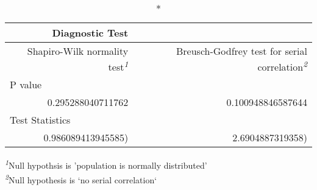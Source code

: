 \setlength{\LTpost}{0mm}
\begin{longtable}{rr}
\caption*{
{\large Diagnostic Test}
} \\ 
\toprule
Shapiro-Wilk normality test\textsuperscript{\textit{1}} & Breusch-Godfrey test for serial correlation\textsuperscript{\textit{2}} \\ 
\midrule
\multicolumn{2}{l}{P value} \\ 
\midrule
0.295288040711762 & 0.100948846587644 \\ 
\midrule
\multicolumn{2}{l}{Test Statistics} \\ 
0.986089413945585) & 2.6904887319358) \\ 
\bottomrule
\end{longtable}
\begin{minipage}{\linewidth}
\textsuperscript{\textit{1}}Null hypothsis is 'population is normally distributed'\\
\textsuperscript{\textit{2}}Null hypothesis is `no serial correlation`\\
\end{minipage}

